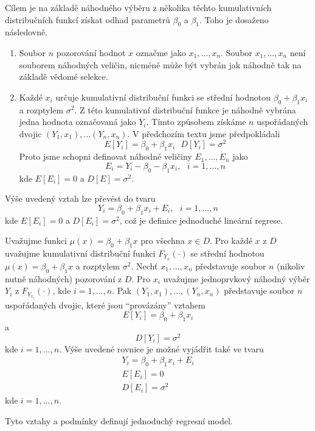 Cílem je na základě náhodného výběru z několika těchto kumulativních distribučních funkcí získat odhad parametrů $\beta_0$ a $\beta_1$. Toho je dosaženo následovně.
\begin{enumerate}
\item Soubor $n$ pozorování hodnot $x$ označme jako $x_1, ..., x_n$. Soubor $x_1, ..., x_n$ není souborem náhodných veličin, nicméně může být vybrán jak náhodně tak na základě vědomé selekce.
\item Každé $x_i$ určuje kumulativní distribuční funkci se střední hodnotou $\beta_0 + \beta_1 x_i$ a rozptylem $\sigma^2$. Z této kumulativní distribuční funkce je náhodně vybrána jedna hodnota označovaná jako $Y_i$. Tímto způsobem získáme $n$ uspořádaných dvojic $(Y_1, x_1), ... (Y_n, x_n)$. V předchozím textu jsme předpokládali
\begin{equation*}
E[Y_i] = \beta_0 + \beta_1 x_i ~~~ D[Y_i] = \sigma^2
\end{equation*}
Proto jsme schopni definovat náhodné veličiny $E_1, ..., E_n$ jako
\begin{equation*}
E_i = Y_i - \beta_0 - \beta_1 x_i, ~~~ i = 1, ..., n
\end{equation*}
kde $E[E_i] = 0$ a $D[E] = \sigma^2$.
\end{enumerate}
Výše uvedený vztah lze převést do tvaru
\begin{equation*}
Y_i = \beta_0 + \beta_1 x_i + E_i, ~~~ i = 1, ..., n
\end{equation*}
kde $E[E_i] = 0$ a $D[E_i] = \sigma^2$, což je definice jednoduché lineární regrese.

\begin{definition}
Uvažujme funkci $\mu(x) = \beta_0 + \beta_1x$ pro všechna $x \in D$. Pro každé $x$ z $D$ uvažujme kumulativní distribuční funkci $F_{Y_x}(\cdot)$ se střední hodnotou $\mu(x) = \beta_0 + \beta_1 x$ a rozptylem $\sigma^2$. Nechť $x_1, ..., x_n$ představuje soubor $n$ (nikoliv nutně náhodných) pozorování z $D$. Pro $x_i$ uvažujme jednoprvkový náhodný výběr $Y_i$ z $F_{Y_{x_i}}(\cdot)$, kde $i = 1, ..., n$. Pak $(Y_1, x_1), ..., (Y_n, x_n)$ představuje soubor $n$ uspořádaných dvojic, které jsou ``provázány'' vztahem
\begin{equation*}
E[Y_i] = \beta_0 + \beta_1 x_i
\end{equation*}
a
\begin{equation*}
D[Y_i] = \sigma^2
\end{equation*}
kde $i = 1, ..., n$. Výše uvedené rovnice je možné vyjádřit také ve tvaru
\begin{gather*}
Y_i = \beta_0 + \beta_1 x_i + E_i\\
E[E_i] = 0\\
D[E_i] = \sigma^2
\end{gather*}
kde $i = 1, ..., n$.

Tyto vztahy a podmínky definují jednoduchý regresní model.
\end{definition}

